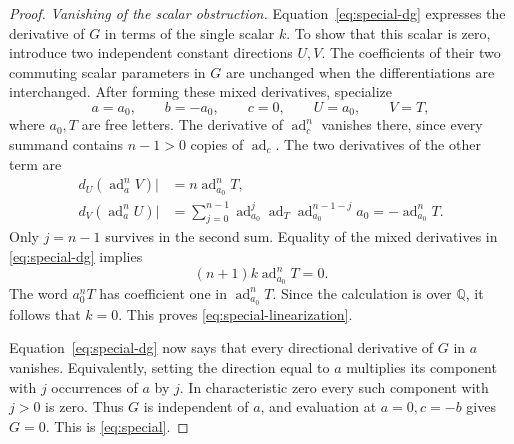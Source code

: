 \documentclass[11pt]{article}
\newcommand{\Q}{\mathbb Q}
\DeclareMathOperator{\ad}{ad}
\theoremstyle{definition}
\theoremstyle{remark}
\numberwithin{equation}{section}
\begin{document}
\begin{proof}
\emph{Vanishing of the scalar obstruction.}
Equation~\eqref{eq:special-dg} expresses the derivative of \(G\) in
terms of the single scalar \(k\).  To show that this scalar is zero,
introduce two independent constant directions \(U,V\).  The
coefficients of their two commuting scalar parameters in \(G\)
are unchanged when the differentiations are interchanged.  After
forming these mixed derivatives, specialize
\[
 a=a_0,\qquad b=-a_0,\qquad c=0,\qquad U=a_0,\qquad V=T,
\]
where \(a_0,T\) are free letters.  The derivative of \(\ad_c^n\)
vanishes there, since every summand contains \(n-1>0\) copies of
\(\ad_c\).  The two derivatives of the other term are
\begin{align*}
 d_U(\ad_a^nV)\big|&=n\ad_{a_0}^nT,\\
 d_V(\ad_a^nU)\big|
   &=\sum_{j=0}^{n-1}
       \ad_{a_0}^{j}\ad_T\ad_{a_0}^{n-1-j}a_0
     =-\ad_{a_0}^{n}T.
\end{align*}
Only \(j=n-1\) survives in the second sum.  Equality of the mixed
derivatives in \eqref{eq:special-dg} implies
\[
 (n+1)k\ad_{a_0}^{n}T=0.
\]
The word \(a_0^nT\) has coefficient one in
\(\ad_{a_0}^{n}T\).  Since the calculation is over \(\Q\), it
follows that \(k=0\).  This proves
\eqref{eq:special-linearization}.

Equation~\eqref{eq:special-dg} now says that every directional
derivative of \(G\) in \(a\) vanishes.  Equivalently, setting the
direction equal to \(a\) multiplies its component with \(j\)
occurrences of \(a\) by \(j\).  In characteristic zero every such
component with \(j>0\) is zero.  Thus \(G\) is independent of
\(a\), and evaluation at \(a=0,c=-b\) gives \(G=0\).  This is
\eqref{eq:special}.
\end{proof}
\end{document}
